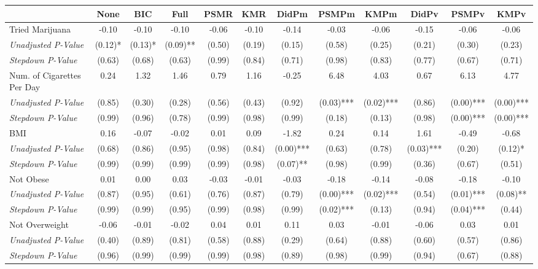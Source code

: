 \begin{tabular}{l c c c c c c c c c c c}
\toprule
 & None & BIC & Full & PSMR & KMR & DidPm & PSMPm & KMPm & DidPv & PSMPv & KMPv \\
\midrule
Tried Marijuana & -0.10 & -0.10 & -0.10 & -0.06 & -0.10 & -0.14 & -0.03 & -0.06 & -0.15 & -0.06 & -0.06 \\
\quad \textit{Unadjusted P-Value} & (0.12)* & (0.13)* & (0.09)** & (0.50) & (0.19) & (0.15) & (0.58) & (0.25) & (0.21) & (0.30) & (0.23) \\
\quad \textit{Stepdown P-Value} & (0.63) & (0.68) & (0.63) & (0.99) & (0.84) & (0.71) & (0.98) & (0.83) & (0.77) & (0.67) & (0.71) \\
Num. of Cigarettes Per Day & 0.24 & 1.32 & 1.46 & 0.79 & 1.16 & -0.25 & 6.48 & 4.03 & 0.67 & 6.13 & 4.77 \\
\quad \textit{Unadjusted P-Value} & (0.85) & (0.30) & (0.28) & (0.56) & (0.43) & (0.92) & (0.03)*** & (0.02)*** & (0.86) & (0.00)*** & (0.00)*** \\
\quad \textit{Stepdown P-Value} & (0.99) & (0.96) & (0.78) & (0.99) & (0.98) & (0.99) & (0.18) & (0.13) & (0.98) & (0.00)*** & (0.00)*** \\
BMI & 0.16 & -0.07 & -0.02 & 0.01 & 0.09 & -1.82 & 0.24 & 0.14 & 1.61 & -0.49 & -0.68 \\
\quad \textit{Unadjusted P-Value} & (0.68) & (0.86) & (0.95) & (0.98) & (0.84) & (0.00)*** & (0.63) & (0.78) & (0.03)*** & (0.20) & (0.12)* \\
\quad \textit{Stepdown P-Value} & (0.99) & (0.99) & (0.99) & (0.99) & (0.98) & (0.07)** & (0.98) & (0.99) & (0.36) & (0.67) & (0.51) \\
Not Obese & 0.01 & 0.00 & 0.03 & -0.03 & -0.01 & -0.03 & -0.18 & -0.14 & -0.08 & -0.18 & -0.10 \\
\quad \textit{Unadjusted P-Value} & (0.87) & (0.95) & (0.61) & (0.76) & (0.87) & (0.79) & (0.00)*** & (0.02)*** & (0.54) & (0.01)*** & (0.08)** \\
\quad \textit{Stepdown P-Value} & (0.99) & (0.99) & (0.95) & (0.99) & (0.98) & (0.99) & (0.02)*** & (0.13) & (0.94) & (0.04)*** & (0.44) \\
Not Overweight & -0.06 & -0.01 & -0.02 & 0.04 & 0.01 & 0.11 & 0.03 & -0.01 & -0.06 & 0.03 & 0.01 \\
\quad \textit{Unadjusted P-Value} & (0.40) & (0.89) & (0.81) & (0.58) & (0.88) & (0.29) & (0.64) & (0.88) & (0.60) & (0.57) & (0.86) \\
\quad \textit{Stepdown P-Value} & (0.96) & (0.99) & (0.99) & (0.99) & (0.98) & (0.89) & (0.98) & (0.99) & (0.94) & (0.67) & (0.88) \\

\end{tabular}

